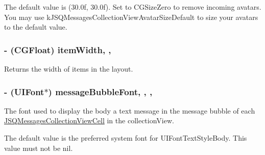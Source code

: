 The default value is {\ttfamily (30.\+0f, 30.\+0f)}. Set to {\ttfamily C\+G\+Size\+Zero} to remove incoming avatars. You may use {\ttfamily k\+J\+S\+Q\+Messages\+Collection\+View\+Avatar\+Size\+Default} to size your avatars to the default value. \hypertarget{interface_j_s_q_messages_collection_view_flow_layout_ae9ad830cfdb3a3fe8375cbd22af5c7e8}{}
\subsubsection[{item\+Width}]{\setlength{\rightskip}{0pt plus 5cm}-\/ (C\+G\+Float) item\+Width\hspace{0.3cm}{\ttfamily [read]}, {\ttfamily [nonatomic]}, {\ttfamily [assign]}}\label{interface_j_s_q_messages_collection_view_flow_layout_ae9ad830cfdb3a3fe8375cbd22af5c7e8}
Returns the width of items in the layout. \hypertarget{interface_j_s_q_messages_collection_view_flow_layout_a9a98700ffd5c4acd0538b01b3da945c3}{}
\subsubsection[{message\+Bubble\+Font}]{\setlength{\rightskip}{0pt plus 5cm}-\/ (U\+I\+Font$\ast$) message\+Bubble\+Font\hspace{0.3cm}{\ttfamily [read]}, {\ttfamily [write]}, {\ttfamily [nonatomic]}, {\ttfamily [strong]}}\label{interface_j_s_q_messages_collection_view_flow_layout_a9a98700ffd5c4acd0538b01b3da945c3}
The font used to display the body a text message in the message bubble of each {\ttfamily \hyperlink{interface_j_s_q_messages_collection_view_cell}{J\+S\+Q\+Messages\+Collection\+View\+Cell}} in the collection\+View.

The default value is the preferred system font for {\ttfamily U\+I\+Font\+Text\+Style\+Body}. This value must not be {\ttfamily nil}. \hypertarget{interface_j_s_q_messages_collection_view_flow_layout_a2d57bd15268e1063676557bcc73c71b3}{}
